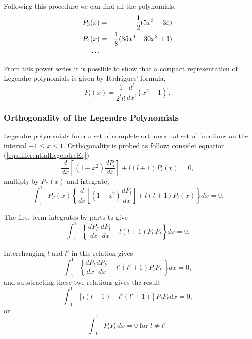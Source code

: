 Following this procedure we can find  all the polynomials,
\begin{eqnarray}
P_3(x) &=& \frac{1}{2} (5x^3 - 3x)\\
P_4(x) &=& \frac{1}{8} (35x^4 - 30x^2 + 3)\\
\cdots & & \notag
\end{eqnarray}

From this power series it is possible to show that a compact representation of Legendre polynomials is given by Rodrigues' formula,
\begin{equation}
P_l (x) = \frac{1}{2^l l!} \frac{d^l}{dx^l} (x^2 - 1)^l.
\end{equation}

\subsubsection{Orthogonality of the Legendre Polynomials}

Legendre polynomials form a set of complete orthonormal set of functions on the interval $-1 \le x \le 1$. Orthogonality is probed as follow: consider equation (\ref{eq:differentialLegendreEq})
\begin{equation}
\frac{d}{dx} \left[ (1-x^2)  \frac{dP_l}{dx} \right] + l(l+1)  P_l (x) = 0,
\end{equation}
multiply by $P_{l'} (x)$ and integrate,
\begin{equation}
\int_{-1}^{1} P_{l'} (x) \left\lbrace \frac{d}{dx} \left[ (1-x^2)  \frac{dP_l}{dx} \right] + l(l+1)  P_l(x) \right\rbrace dx= 0.
\end{equation}

The first term integrates by parts to give
\begin{equation}
\int_{-1}^{1} \left\lbrace \frac{dP_{l'}}{dx}   \frac{dP_l}{dx} + l(l+1)  P_{l'}  P_l \right\rbrace dx= 0.
\end{equation}

Interchanging $l$ and $l'$ in this relation gives
\begin{equation}
\int_{-1}^{1} \left\lbrace \frac{dP_{l}}{dx}   \frac{dP_{l'}}{dx} + l'(l'+1)  P_{l}  P_{l'} \right\rbrace dx= 0,
\end{equation}
and substracting these two relations gives the result
\begin{equation}
\int_{-1}^{1} \left[ l(l+1) -  l'(l'+1)  \right] P_{l}  P_{l'}  dx= 0,
\end{equation}
or
\begin{equation}
\int_{-1}^{1} P_{l}  P_{l'}  dx= 0 \text{ for } l \neq l'. \label{eq:orthogonalityLegendre1}
\end{equation}


